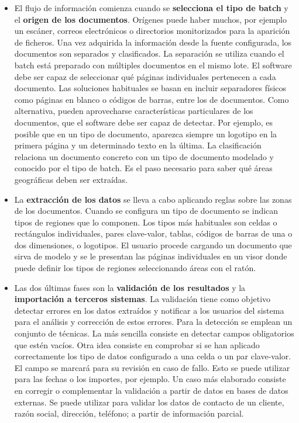 \begin{itemize}
    \item El flujo de información comienza cuando se \textbf{selecciona el tipo de batch} y el \textbf{origen de los documentos}. Orígenes puede haber muchos, por ejemplo un escáner, correos electrónicos o directorios monitorizados para la aparición de ficheros. Una vez adquirida la información desde la fuente configurada, los documentos son separados y clasificados. La separación se utiliza cuando el batch está preparado con múltiples documentos en el mismo lote. El software debe ser capaz de seleccionar qué páginas individuales pertenecen a cada documento. Las soluciones habituales se basan en incluir separadores físicos como páginas en blanco o códigos de barras, entre los de documentos. Como alternativa, pueden aprovecharse características particulares de los documentos, que el software debe ser capaz de detectar. Por ejemplo, es posible que en un tipo de documento, aparezca siempre un logotipo en la primera página y un determinado texto en la última. La clasificación relaciona un documento concreto con un tipo de documento modelado y conocido por el tipo de batch. Es el paso necesario para saber qué áreas geográficas deben ser extraídas.
    
    \item La \textbf{extracción de los datos} se lleva a cabo aplicando reglas sobre las zonas de los documentos. Cuando se configura un tipo de documento se indican tipos de regiones que lo componen. Los tipos más habituales son celdas o rectángulos individuales, pares clave-valor, tablas, códigos de barras de una o dos dimensiones, o logotipos. El usuario procede cargando un documento que sirva de modelo y se le presentan las páginas individuales en un visor donde puede definir los tipos de regiones seleccionando áreas con el ratón.
    
    \item Las dos últimas fases son la \textbf{validación de los resultados} y la \textbf{importación a terceros sistemas}. La validación tiene como objetivo detectar errores en los datos extraídos y notificar a los usuarios del sistema para el análisis y corrección de estos errores. Para la detección se emplean un conjunto de técnicas. La más sencilla consiste en detectar campos obligatorios que estén vacíos. Otra idea consiste en comprobar si se han aplicado correctamente los tipo de datos configurado a una celda o un par clave-valor. El campo se marcará para su revisión en caso de fallo. Esto se puede utilizar para las fechas o los importes, por ejemplo. Un caso más elaborado consiste en corregir o complementar la validación a partir de datos en bases de datos externas. Se puede utilizar para validar los datos de contacto de un cliente, razón social, dirección, teléfono; a partir de información parcial.
    

\end{itemize}
